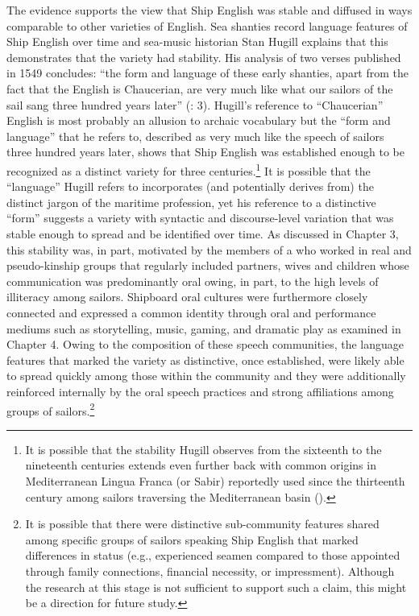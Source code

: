 The evidence supports the view that Ship English was stable and diffused in ways comparable to other varieties of English. Sea shanties record language features of Ship English over time and sea-music historian Stan Hugill explains that this demonstrates that the variety had stability. His analysis of two  verses published in 1549 concludes: “the form and language of these early shanties, apart from the fact that the English is Chaucerian, are very much like what our sailors of the sail sang three hundred years later” (\citealt{Hugill1969}: 3). Hugill’s reference to “Chaucerian” English is most probably an allusion to archaic vocabulary but the “form and language” that he refers to, described as very much like the speech of sailors three hundred years later, shows that Ship English was established enough to be recognized as a distinct variety for three centuries.\footnote{It is possible that the stability Hugill observes from the sixteenth to the nineteenth centuries extends even further back with common origins in Mediterranean Lingua Franca (or Sabir) reportedly used since the thirteenth century among sailors traversing the Mediterranean basin (\citealt{Parkvall2005}).}  It is possible that the “language” Hugill refers to incorporates (and potentially derives from) the distinct jargon of the maritime profession, yet his reference to a distinctive “form” suggests a variety with syntactic and discourse-level variation that was stable enough to spread and be identified over time. As discussed in Chapter 3, this stability was, in part, motivated by the members of a  who worked in real and pseudo-kinship groups that regularly included partners, wives and children whose communication was predominantly oral owing, in part, to the high levels of illiteracy among sailors. Shipboard oral cultures were furthermore closely connected and expressed a common identity through oral and performance mediums such as storytelling, music, gaming, and dramatic play as examined in Chapter 4. Owing to the composition of these speech communities, the language features that marked the variety as distinctive, once established, were likely able to spread quickly among those within the community and they were additionally reinforced internally by the oral speech practices and strong affiliations among groups of sailors.\footnote{It is possible that there were distinctive sub-community features shared among specific groups of sailors speaking Ship English that marked differences in status (e.g., experienced seamen compared to those appointed through family connections, financial necessity, or impressment). Although the research at this stage is not sufficient to support such a claim, this might be a direction for future study.}  

